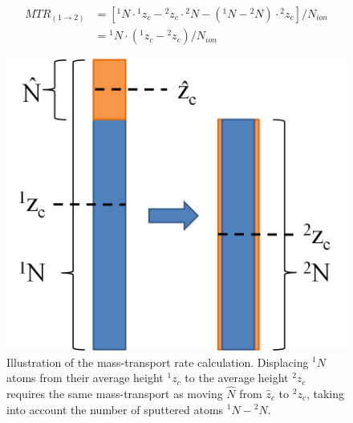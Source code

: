 \begin{equation}  
\begin{split}
    MTR_{(1 \rightarrow 2)} & = [ {}^{1}N\cdot {}^{1}z_{c} -{}^{2}z_{c} \cdot {}^{2}N - ({}^{1}N - {}^{2}N) \cdot {}^{2}z_{c}]/N_{ion} \\
		& = {}^{1}N \cdot ({}^{1}z_{c} - {}^{2}z_{c})/N_{ion} 
	\label{MRTequation}
	\end{split}
\end{equation}

\begin{figure}
	\centering
		\includegraphics[width=.3\textwidth]{images/MTRillustration.png}
	\caption{Illustration of the mass-transport rate calculation. Displacing ${}^{1}N$ atoms from their average height ${}^{1}z_{c}$ to the average height ${}^{2}z_{c}$ requires the same mass-transport as moving $\hat{N}$ from $\hat{z}_c$ to ${}^{2}z_{c}$, taking into account the number of sputtered atoms ${}^{1}N-{}^{2}N$.}
	\label{MTRillustration}
\end{figure}

